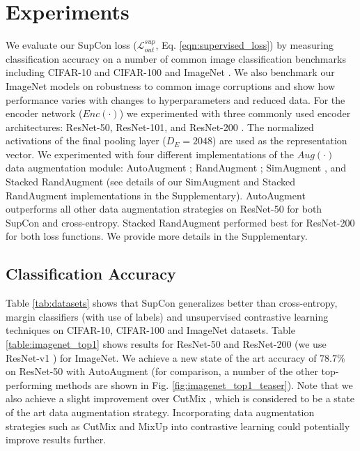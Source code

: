 \section{Experiments}
\label{sec:experiments}
We evaluate our SupCon loss ($\mathcal{L}_{out}^{sup}$, Eq. \ref{eqn:supervised_loss}) by measuring classification accuracy on a number of common image classification benchmarks including CIFAR-10 and CIFAR-100 \cite{krizhevsky2009learning} and ImageNet \cite{deng2009imagenet}. We also benchmark our ImageNet models on robustness to common image corruptions \cite{hendrycks2019benchmarking} and show how performance varies with changes to hyperparameters and reduced data. For the encoder network ($Enc(\cdot)$) we experimented with three commonly used encoder architectures: ResNet-50, ResNet-101, and ResNet-200 \cite{he2016deep}. The normalized activations of the final pooling layer ($D_E=2048$) are used as the representation vector. We experimented with four different implementations of the $Aug(\cdot)$ data augmentation module: AutoAugment \cite{cubuk2019autoaugment}; RandAugment \cite{cubuk2019randaugment}; SimAugment \cite{chen2020simple}, and Stacked RandAugment \cite{tian2020makes} (see details of our SimAugment and Stacked RandAugment implementations in the Supplementary). AutoAugment outperforms all other data augmentation strategies on ResNet-50 for both SupCon and cross-entropy. Stacked RandAugment performed best for ResNet-200 for both loss functions. We provide more details in the Supplementary.



\subsection{Classification Accuracy}
Table \ref{tab:datasets} shows that SupCon generalizes better than cross-entropy, margin classifiers (with use of labels) and unsupervised contrastive learning techniques on CIFAR-10, CIFAR-100 and ImageNet datasets. Table \ref{table:imagenet_top1} shows results for ResNet-50 and ResNet-200 (we use ResNet-v1 \cite{he2016deep}) for ImageNet. We achieve a new state of the art accuracy of $78.7\%$ on ResNet-50 with AutoAugment (for comparison, a number of the other top-performing methods are shown in Fig. \ref{fig:imagenet_top1_teaser}). Note that we also achieve a slight improvement over CutMix \cite{yun2019cutmix}, which is considered to be a state of the art data augmentation strategy. Incorporating data augmentation strategies such as CutMix \cite{yun2019cutmix} and MixUp \cite{zhang2017mixup} into contrastive learning could potentially improve results further. 

